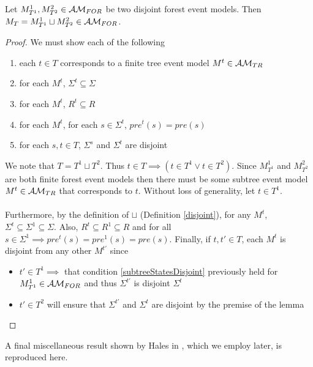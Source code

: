 \begin{lemma} \label{disjForestIsForest}
Let $M^1_{T^1}, M^2_{T^2} \in \mathcal{AM}_{FOR}$ be two disjoint forest event models.
Then $M_T = M^1_{T^1} \sqcup M^2_{T^2} \in \mathcal{AM}_{FOR}$.
\end{lemma}

\begin{proof}
We must show each of the following
\begin{enumerate}
	\item each $t \in T$ corresponds to a finite tree event model $M^t \in \mathcal{AM}_{TR}$ \label{treeCorrespondence}
	\item for each $M^t$, $\Sigma^t \subseteq \Sigma$ \label{forestStateSubsets}
	\item for each $M^t$, $R^t \subseteq R$ \label{forestEdgeSubsets}
	\item for each $M^t$, for each $s \in \Sigma^t$, $pre^t(s) = pre(s)$ \label{preconMatch}
	\item for each $s, t \in T$, $\Sigma^s$ and $\Sigma^t$ are disjoint \label{subtreeStatesDisjoint}
\end{enumerate}

We note that $T = T^1 \sqcup T^2$.
Thus $t \in T \implies (t \in T^1 \lor t \in T^2)$.
Since $M^1_{T^1}$ and $M^2_{T^2}$ are both finite forest event models then there must be some
subtree event model $M^t \in \mathcal{AM}_{TR}$ that corresponds to $t$.
Without loss of generality, let $t \in T^1$.\\
\\
Furthermore, by the definition of $\sqcup$ (Definition \ref{disjoint}), for any $M^t$, $\Sigma^t \subseteq \Sigma^1 \subseteq \Sigma$.
Also, $R^t \subseteq R^1 \subseteq R$ and for all $s \in \Sigma^1 \implies pre^t(s) = pre^1(s) =
pre(s)$.
Finally, if $t, t' \in T$, each $M^t$ is disjoint from any other $M^{t'}$ since
\begin{itemize}
	\item $t' \in T^1 \implies$ that condition \ref{subtreeStatesDisjoint} previously held for
	$M^1_{T^1} \in \mathcal{AM}_{FOR}$ and thus $\Sigma^{t'}$ is disjoint $\Sigma^t$
	\item $t' \in T^2$ will ensure that $\Sigma^{t'}$ and $\Sigma^t$ are disjoint by the premise of
	the lemma
\end{itemize}
\end{proof}

A final miscellaneous result shown by Hales in \cite{hales13synthesis}, which we employ later, is reproduced here.

